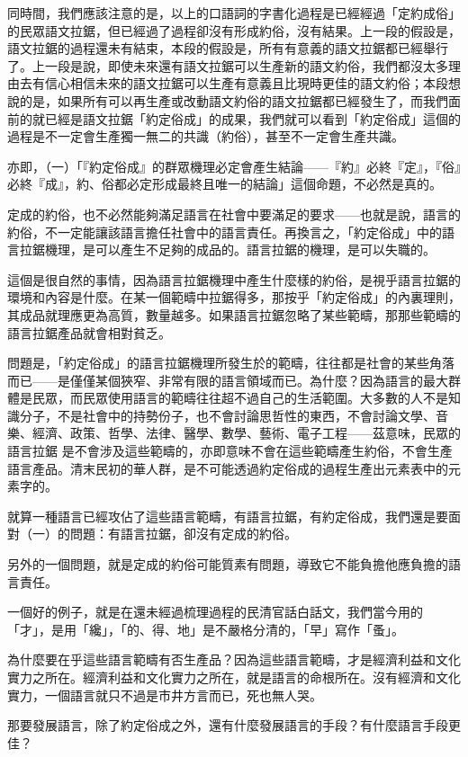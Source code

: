 \documentclass[a5paper, 10pt, openany]{book} %
\begin{document}
同時間，我們應該注意的是，以上的口語詞的字書化過程是已經經過「定約成俗」的民眾語文拉鋸，但已經過了過程卻沒有形成約俗，沒有結果。上一段的假設是，語文拉鋸的過程還未有結束，本段的假設是，所有有意義的語文拉鋸都已經舉行了。上一段是說，即使未來還有語文拉鋸可以生產新的語文約俗，我們都沒太多理由去有信心相信未來的語文拉鋸可以生產有意義且比現時更佳的語文約俗；本段想說的是，如果所有可以再生產或改動語文約俗的語文拉鋸都已經發生了，而我們面前的就已經是語文拉鋸「約定俗成」的成果，我們就可以看到「約定俗成」這個的過程是不一定會生產獨一無二的共識（約俗），甚至不一定會生產共識。

亦即，（一）「『約定俗成』的群眾機理必定會產生結論——『約』必終『定』，『俗』必終『成』，約、俗都必定形成最終且唯一的結論」這個命題，不必然是真的。

定成的約俗，也不必然能夠滿足語言在社會中要滿足的要求——也就是說，語言的約俗，不一定能讓該語言擔任社會中的語言責任。再換言之，「約定俗成」中的語言拉鋸機理，是可以產生不足夠的成品的。語言拉鋸的機理，是可以失職的。

這個是很自然的事情，因為語言拉鋸機理中產生什麼樣的約俗，是視乎語言拉鋸的環境和內容是什麼。在某一個範疇中拉鋸得多，那按乎「約定俗成」的內裏理則，其成品就理應更為高質，數量越多。如果語言拉鋸忽略了某些範疇，那那些範疇的語言拉鋸產品就會相對貧乏。

問題是，「約定俗成」的語言拉鋸機理所發生於的範疇，往往都是社會的某些角落而已——是僅僅某個狹窄、非常有限的語言領域而已。為什麼？因為語言的最大群體是民眾，而民眾使用語言的範疇往往超不過自己的生活範圍。大多數的人不是知識分子，不是社會中的持勢份子，也不會討論思哲性的東西，不會討論文學、音樂、經濟、政策、哲學、法律、醫學、數學、藝術、電子工程——茲意味，民眾的語言拉鋸
是不會涉及這些範疇的，亦即意味不會在這些範疇產生約俗，不會生產語言產品。清末民初的華人群，是不可能透過約定俗成的過程生產出元素表中的元素字的。

就算一種語言已經攻佔了這些語言範疇，有語言拉鋸，有約定俗成，我們還是要面對（一）的問題：有語言拉鋸，卻沒有定成的約俗。

另外的一個問題，就是定成的約俗可能質素有問題，導致它不能負擔他應負擔的語言責任。

一個好的例子，就是在還未經過梳理過程的民清官話白話文，我們當今用的「才」，是用「纔」，「的、得、地」是不嚴格分清的，「早」寫作「蚤」。

為什麼要在乎這些語言範疇有否生產品？因為這些語言範疇，才是經濟利益和文化實力之所在。經濟利益和文化實力之所在，就是語言的命根所在。沒有經濟和文化實力，一個語言就只不過是市井方言而已，死也無人哭。

那要發展語言，除了約定俗成之外，還有什麼發展語言的手段？有什麼語言手段更佳？
\end{document}
